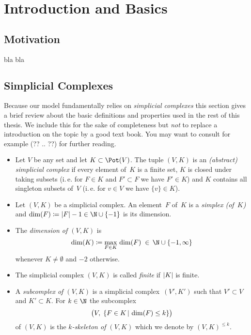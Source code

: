 \chapter{Introduction and Basics}
%
\section{Motivation}
bla bla  %


\section{Simplicial Complexes}
Because our model fundamentally relies on \emph{simplicial complexes}
this section gives a brief review about the basic definitions and properties
used in the rest of this thesis. We include this for the sake of completeness
but \emph{not} to replace a introduction on the topic by a good text book.
You may want to consult for example (?? .. ??) %
for further reading.
 
\begin{thDef}\hfill
    \begin{itemize}
        \item
            Let $V$ be any set and let $K\subset\pot V$. The tuple $(V,K)$ is
            an \emph{(abstract) simplicial complex} if every element of~$K$ is
            a finite set, $K$ is closed under taking subsets (i.\,e. for
            $F\in K$ and $F'\subset F$ we have $F'\in K$) and $K$ contains
            all singleton subsets of~$V$ (i.\,e. for $v\in V$ we have
            $\{v\}\in K$).
            
        \item
            Let $(V,K)$ be a simplicial complex. An element~$F$ of~$K$ is
            a \emph{simplex (of~$K$)} and $\dim(F)\defeq\abs{F}-1
            \in\N\cup\{-1\}$ is its dimension.
            
        \item
            The \emph{dimension of $(V,K)$} is
            \[ \dim(K) \defeq \max_{F\in K} \,\dim(F) \;\in\,\N\cup\{-1,\infty\}
            \]
            whenever $K\neq\emptyset$ and $-2$ otherwise.
            
        \item
            The simplicial complex $(V,K)$ is called \emph{finite} if
            $\abs{K}$ is finite.
            
        \item
            A \emph{subcomplex of $(V,K)$} is a simplicial complex~$(V',K')$
            such that $V'\subset V$ and $K'\subset K$. For $k\in\N$ the
            subcomplex
            \[ \bigl( V,\; \{ F\in K \cMid[\,]{} \dim(F) \leq k \} \bigr) \]
            of $(V,K)$ is the \emph{$k$-skeleton of $(V,K)$} which
            we denote by $(V,K)^{\leq k}$.
    \end{itemize}
\end{thDef}

